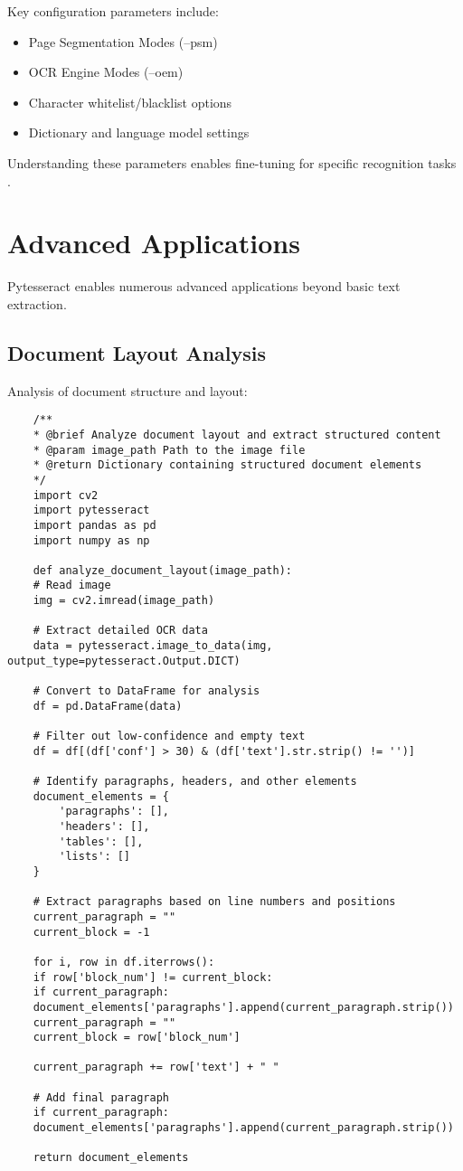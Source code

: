Key configuration parameters include:
\begin{itemize}
	\item Page Segmentation Modes (--psm)
	\item OCR Engine Modes (--oem)
	\item Character whitelist/blacklist options
	\item Dictionary and language model settings
\end{itemize}

Understanding these parameters enables fine-tuning for specific recognition tasks \cite{Restack:2025}.

\section{Advanced Applications}
\label{sec:applications}

Pytesseract enables numerous advanced applications beyond basic text extraction.

\subsection{Document Layout Analysis}
\label{subsec:layout_analysis}

Analysis of document structure and layout:

\begin{verbatim}
	/**
	* @brief Analyze document layout and extract structured content
	* @param image_path Path to the image file
	* @return Dictionary containing structured document elements
	*/
	import cv2
	import pytesseract
	import pandas as pd
	import numpy as np
	
	def analyze_document_layout(image_path):
	# Read image
	img = cv2.imread(image_path)
	
	# Extract detailed OCR data
	data = pytesseract.image_to_data(img, output_type=pytesseract.Output.DICT)
	
	# Convert to DataFrame for analysis
	df = pd.DataFrame(data)
	
	# Filter out low-confidence and empty text
	df = df[(df['conf'] > 30) & (df['text'].str.strip() != '')]
	
	# Identify paragraphs, headers, and other elements
	document_elements = {
		'paragraphs': [],
		'headers': [],
		'tables': [],
		'lists': []
	}
	
	# Extract paragraphs based on line numbers and positions
	current_paragraph = ""
	current_block = -1
	
	for i, row in df.iterrows():
	if row['block_num'] != current_block:
	if current_paragraph:
	document_elements['paragraphs'].append(current_paragraph.strip())
	current_paragraph = ""
	current_block = row['block_num']
	
	current_paragraph += row['text'] + " "
	
	# Add final paragraph
	if current_paragraph:
	document_elements['paragraphs'].append(current_paragraph.strip())
	
	return document_elements
\end{verbatim}

